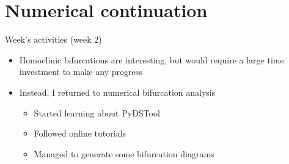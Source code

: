 \documentclass[presentation]{beamer}
\begin{document}
\section{Numerical continuation}
\label{sec:org33208d0}
\begin{frame}[label={sec:org389dab9}]{Week's activities (week 2)}
\begin{itemize}
\item Homoclinic bifurcations are interesting, but would require a large time investment to make any progress
\item Instead, I returned to numerical bifurcation analysis
\begin{itemize}
\item Started learning about PyDSTool
\item Followed online tutorials
\item Managed to generate some bifurcation diagrams
\end{itemize}
\end{itemize}

\end{frame}
\end{document}
